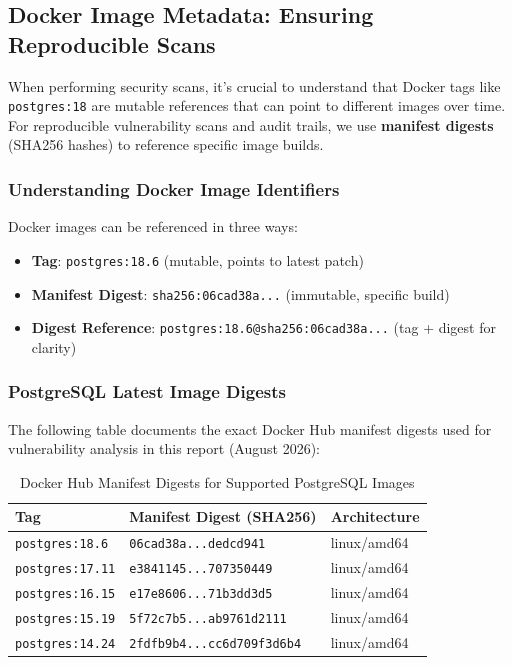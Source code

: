 \documentclass[11pt, a4paper]{article}
\begin{document}
\subsection{Docker Image Metadata: Ensuring Reproducible Scans}
\label{subsec:docker-metadata}

When performing security scans, it's crucial to understand that Docker tags like \texttt{postgres:18} are mutable references that can point to different images over time. For reproducible vulnerability scans and audit trails, we use \textbf{manifest digests} (SHA256 hashes) to reference specific image builds.

\subsubsection{Understanding Docker Image Identifiers}

Docker images can be referenced in three ways:
\begin{itemize}
    \item \textbf{Tag}: \texttt{postgres:18.6} (mutable, points to latest patch)
    \item \textbf{Manifest Digest}: \texttt{sha256:06cad38a...} (immutable, specific build)
    \item \textbf{Digest Reference}: \texttt{postgres:18.6@sha256:06cad38a...} (tag + digest for clarity)
\end{itemize}

\subsubsection{PostgreSQL Latest Image Digests}

The following table documents the exact Docker Hub manifest digests used for vulnerability analysis in this report (August 2026):

\begin{table}[htbp]
\centering
\caption{Docker Hub Manifest Digests for Supported PostgreSQL Images}
\label{tab:docker-digests}
\small
\begin{tabular}{@{}lp{6.5cm}l@{}}
\toprule
\textbf{Tag} & \textbf{Manifest Digest (SHA256)} & \textbf{Architecture} \\ \midrule
\rowcolor{lightorange} \texttt{postgres:18.6} & \texttt{06cad38a...dedcd941} & linux/amd64 \\
\rowcolor{lightorange} \texttt{postgres:17.11} & \texttt{e3841145...707350449} & linux/amd64 \\
\rowcolor{lightorange} \texttt{postgres:16.15} & \texttt{e17e8606...71b3dd3d5} & linux/amd64 \\
\rowcolor{lightorange} \texttt{postgres:15.19} & \texttt{5f72c7b5...ab9761d2111} & linux/amd64 \\
\rowcolor{lightorange} \texttt{postgres:14.24} & \texttt{2fdfb9b4...cc6d709f3d6b4} & linux/amd64 \\
\bottomrule
\end{tabular}
\end{table}
\end{document}
